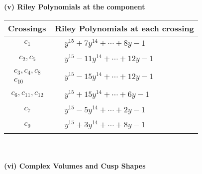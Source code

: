 \documentclass[1p]{elsarticle_modified}
\theoremstyle{definition}
\begin{document}
\newpage\renewcommand{\arraystretch}{1}
\flushleft \textbf{(v) Riley Polynomials at the component}\newline \\
\begin{tabular}{m{50pt}|m{274pt}}
Crossings & \hspace{64pt}Riley Polynomials at each crossing \\
\hline $$\begin{aligned}c_{1}\end{aligned}$$&$\begin{aligned}
&y^{15}+7 y^{14}+\cdots+8 y-1
\end{aligned}$\\
\hline $$\begin{aligned}c_{2},c_{5}\end{aligned}$$&$\begin{aligned}
&y^{15}-11 y^{14}+\cdots+12 y-1
\end{aligned}$\\
\hline $$\begin{aligned}c_{3},c_{4},c_{8}\\c_{10}\end{aligned}$$&$\begin{aligned}
&y^{15}-15 y^{14}+\cdots+12 y-1
\end{aligned}$\\
\hline $$\begin{aligned}c_{6},c_{11},c_{12}\end{aligned}$$&$\begin{aligned}
&y^{15}+15 y^{14}+\cdots+6 y-1
\end{aligned}$\\
\hline $$\begin{aligned}c_{7}\end{aligned}$$&$\begin{aligned}
&y^{15}-5 y^{14}+\cdots+2 y-1
\end{aligned}$\\
\hline $$\begin{aligned}c_{9}\end{aligned}$$&$\begin{aligned}
&y^{15}+3 y^{14}+\cdots+8 y-1
\end{aligned}$\\
\hline
\end{tabular}\\~\\
\newpage\flushleft \textbf{(vi) Complex Volumes and Cusp Shapes}
\end{document}

